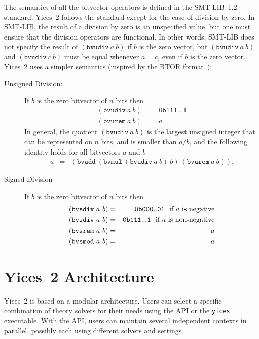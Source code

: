 \documentclass[11pt,twoside,fleqn,openright,titlepage]{cslreport}
\begin{document}
\medskip\noindent
The semantics of all the bitvector operators is defined in the
SMT-LIB~1.2 standard.  Yices~2 follows the standard except for the
case of division by zero.  In SMT-LIB, the result of a division by
zero is an unspecified value, but one must ensure that the division
operators are functional. In other words, SMT-LIB does not specify the
result of $(\mathtt{bvudiv}\ a\ b)$ if $b$ is the zero vector, but
$(\mathtt{bvudiv}\ a\ b)$ and $(\mathtt{bvudiv}\ c\ b)$ must be equal
whenever $a = c$, even if $b$ is the zero vector. Yices~2 uses a
simpler semantics (inspired by the BTOR
format~\cite{Brummayer-etal:2008}):
\begin{description}
\item[Unsigned Division:]  If $b$ is  the zero bitvector  of $n$
  bits then
\begin{eqnarray*}
(\mathtt{bvudiv}\ a\ b) & = & \mathtt{0b111...1} \\
(\mathtt{bvurem}\ a\ b) & = & a
\end{eqnarray*}
In  general, the  quotient $(\mathtt{bvudiv}\  a\ b)$  is  the largest
unsigned integer that  can be represented on $n$  bits, and is smaller
than $a/b$,  and the following  identity holds for all  bitvectors $a$
and $b$
\begin{eqnarray*}
a & = & (\mathtt{bvadd}\ (\mathtt{bvmul}\ (\mathtt{bvudiv}\ a\ b)\ b)\ (\mathtt{bvurem}\ a\ b)).
\end{eqnarray*}

\item[Signed Division] If $b$ is the zero bitvector of $n$ bits then
\begin{eqnarray*}
(\mathtt{bvsdiv}\ a\ b) & = & \mathtt{0b000..01}~~\mbox{\rm if $a$ is negative} \\
(\mathtt{bvsdiv}\ a\ b) & = & \mathtt{0b111...1}~~\mbox{\rm if $a$ is non-negative} \\
(\mathtt{bvsrem}\ a\ b) & = & a \\
(\mathtt{bvsmod}\ a\ b) & = & a
\end{eqnarray*}
\end{description}




\chapter{Yices~2 Architecture}
\label{architecture-chapter}

Yices~2  is based  on  a  modular architecture.   Users  can select  a
specific combination of  theory solvers for their needs  using the API
or the  \texttt{yices} executable.  With the  API, users  can maintain
several  independent   contexts  in  parallel,  possibly   each  using
different solvers and settings.
\end{document}
